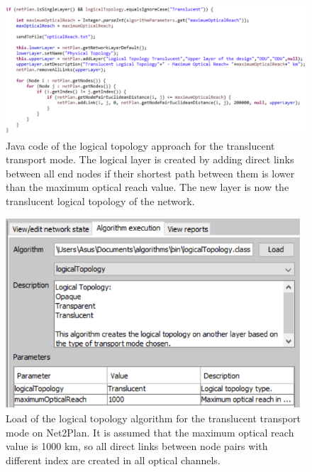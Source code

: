 \begin{figure}[H]
\centering
\includegraphics[width=15cm]{sdf/heuristic/translucent_protection/figures/logical_topology_creation_translucent}
\caption{Java code of the logical topology approach for the translucent transport mode. The logical layer is created by adding direct links between all end nodes if their shortest path between them is lower than the maximum optical reach value. The new layer is now the translucent logical topology of the network.}
\label{logical_topology_creation_translucent_protec}
\end{figure}

\begin{figure}[H]
\centering
\includegraphics[width=11cm]{sdf/heuristic/translucent_protection/figures/logical_topology_load_translucent}
\caption{Load of the logical topology algorithm for the translucent transport mode on Net2Plan. It is assumed that the maximum optical reach value is 1000 km, so all direct links between node pairs with different index are created in all optical channels.}
\label{logical_topology_load_translucent_protec}
\end{figure}

